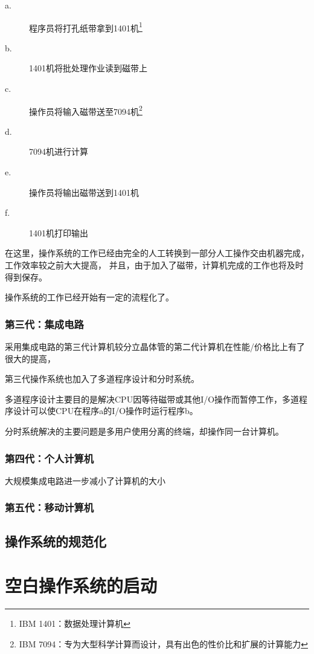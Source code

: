 \documentclass{swfcthesis}
\begin{document}
\begin{description}
\item[a.]程序员将打孔纸带拿到1401机\footnote{IBM 1401：数据处理计算机\cite{ibm1401}}
\item[b.]1401机将批处理作业读到磁带上
\item[c.]操作员将输入磁带送至7094机\footnote{IBM 7094：专为大型科学计算而设计，具有出色的性价比和扩展的计算能力\cite{ibm7094}}
\item[d.]7094机进行计算
\item[e.]操作员将输出磁带送到1401机
\item[f.]1401机打印输出
\end{description}

在这里，操作系统的工作已经由完全的人工转换到一部分人工操作交由机器完成，工作效率较之前大大提高，
并且，由于加入了磁带，计算机完成的工作也将及时得到保存。

操作系统的工作已经开始有一定的流程化了。

\subsection{第三代：集成电路}

采用集成电路的第三代计算机较分立晶体管的第二代计算机在性能/价格比上有了很大的提高，

第三代操作系统也加入了多道程序设计和分时系统。

多道程序设计主要目的是解决CPU因等待磁带或其他I/O操作而暂停工作，多道程序设计可以使CPU在程序a的I/O操作时运行程序b。

分时系统解决的主要问题是多用户使用分离的终端，却操作同一台计算机。

\subsection{第四代：个人计算机}

大规模集成电路进一步减小了计算机的大小

\subsection{第五代：移动计算机}

\section{操作系统的规范化}

\chapter{空白操作系统的启动}
\end{document}
